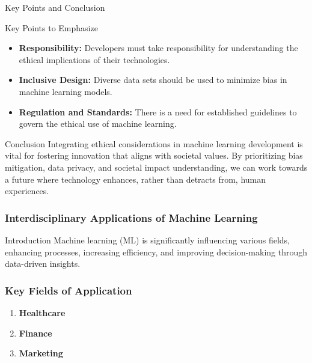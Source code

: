 \documentclass[aspectratio=169]{beamer}
\begin{document}
\begin{frame}[fragile]{Key Points and Conclusion}
    \begin{block}{Key Points to Emphasize}
        \begin{itemize}
            \item \textbf{Responsibility:} Developers must take responsibility for understanding the ethical implications of their technologies.
            \item \textbf{Inclusive Design:} Diverse data sets should be used to minimize bias in machine learning models.
            \item \textbf{Regulation and Standards:} There is a need for established guidelines to govern the ethical use of machine learning.
        \end{itemize}
    \end{block}

    \begin{block}{Conclusion}
        Integrating ethical considerations in machine learning development is vital for fostering innovation that aligns with societal values. By prioritizing bias mitigation, data privacy, and societal impact understanding, we can work towards a future where technology enhances, rather than detracts from, human experiences.
    \end{block}
\end{frame}

\begin{frame}[fragile]
    \frametitle{Interdisciplinary Applications of Machine Learning}
    \begin{block}{Introduction}
        Machine learning (ML) is significantly influencing various fields, enhancing processes, increasing efficiency, and improving decision-making through data-driven insights.
    \end{block}
\end{frame}

\begin{frame}[fragile]
    \frametitle{Key Fields of Application}
    \begin{enumerate}
        \item \textbf{Healthcare}
        \item \textbf{Finance}
        \item \textbf{Marketing}
    \end{enumerate}
\end{frame}
\end{document}
